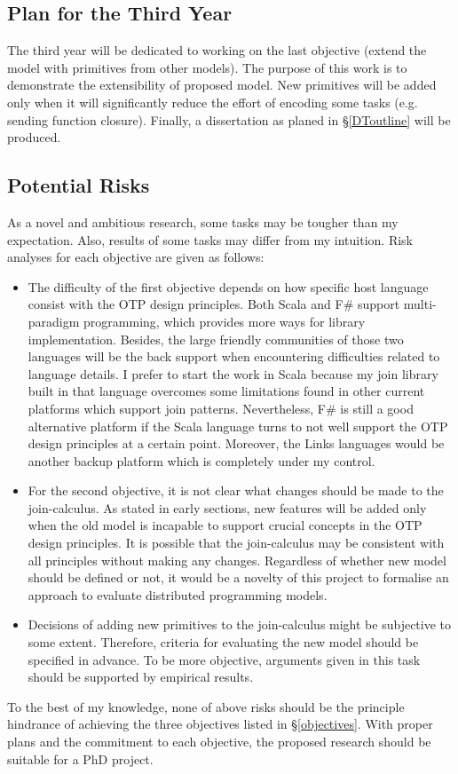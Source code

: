 \subsection{Plan for the Third Year}
The third year will be dedicated to working on the last objective (extend the model with primitives from other models).  The purpose of this work is to demonstrate the extensibility of proposed model.  New primitives will be added only when it will significantly reduce the effort of encoding some tasks (e.g. sending function closure).  Finally, a dissertation as planed in \S\ref{DToutline} will be produced.

\subsection{Potential Risks}

As a novel and ambitious research, some tasks may be tougher than my expectation.  Also, results of some tasks may differ from my intuition.  Risk analyses for each objective are given as follows:

\begin{itemize}
  \item The difficulty of the first objective depends on how specific host language consist with the OTP design principles.  Both Scala and F\# support multi-paradigm programming, which provides more ways for library implementation.  Besides, the large friendly communities of those two languages will be the back support when encountering  difficulties related to language details.  I prefer to start the work in Scala because my join library built in that language overcomes some limitations found in other current platforms which support join patterns.  Nevertheless, F\# is still a good alternative platform if the Scala language turns to not well support the OTP design principles at a certain point.  Moreover, the Links languages would be another backup platform which is completely under my control. 
  \item For the second objective, it is not clear what changes should be made to the join-calculus.  As stated in early sections, new features will be added only when the old model is incapable to support crucial concepts in the OTP design principles.  It is possible that the join-calculus may be consistent with all principles without making any changes.  Regardless of whether new model should be defined or not, it would be a novelty of this project to formalise an approach to evaluate distributed programming models.
  \item Decisions of adding new primitives to the join-calculus might be subjective to some extent.  Therefore, criteria for evaluating the new model should be specified in advance.  To be more objective, arguments given in this task should be supported by empirical results.
\end{itemize}  

To the best of my knowledge, none of above risks should be the principle hindrance of achieving the three objectives listed in \S\ref{objectives}.  With proper plans and the commitment to each objective, the proposed research should be suitable for a PhD project.